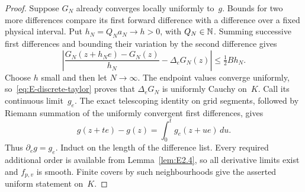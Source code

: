 \begin{proof}
Suppose $G_N$ already converges locally uniformly to~$g$. Bounds for two more differences compare its first forward difference with a difference over a fixed physical interval. Put $h_N=Q_Na_N\to h>0$, with $Q_N\in\mathbb{N}$. Summing successive first differences and bounding their variation by the second difference gives
\begin{equation}\label{eq:E-discrete-taylor}
\left|\frac{G_N(z+h_Ne)-G_N(z)}{h_N}-\Delta_eG_N(z)\right|
\le\tfrac12B h_N.
\end{equation}
Choose $h$ small and then let $N\to\infty$. The endpoint values converge uniformly, so~\eqref{eq:E-discrete-taylor} proves that $\Delta_eG_N$ is uniformly Cauchy on~$K$. Call its continuous limit~$g_e$. The exact telescoping identity on grid segments, followed by Riemann summation of the uniformly convergent first differences, gives
\begin{equation*}
g(z+te)-g(z)=\int_0^t g_e(z+ue)\,du.
\end{equation*}
Thus $\partial_eg=g_e$. Induct on the length of the difference list. Every required additional order is available from Lemma~\ref{lem:E2.4}, so all derivative limits exist and $f_{p,v}$ is smooth. Finite covers by such neighbourhoods give the asserted uniform statement on~$K$.
\end{proof}

